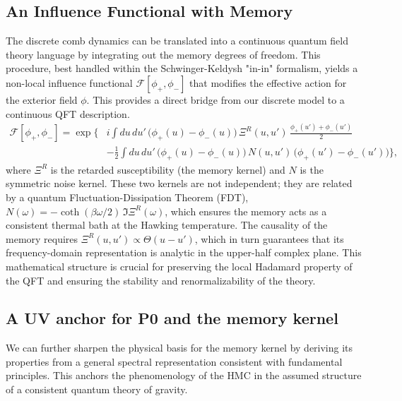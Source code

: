\documentclass[a4paper,11pt]{article}
\newcommand{\HMC}{\textsc{HMC}\xspace}
\theoremstyle{plain}
\theoremstyle{definition}
\theoremstyle{remark}
\begin{document}
\subsection{An Influence Functional with Memory}
\label{sec:influence}
The discrete comb dynamics can be translated into a continuous quantum field theory language by integrating out the memory degrees of freedom. This procedure, best handled within the Schwinger-Keldysh "in-in" formalism, yields a non-local influence functional $\mathcal{F}[\phi_+, \phi_-]$ that modifies the effective action for the exterior field $\phi$. This provides a direct bridge from our discrete model to a continuous QFT description.
\begin{align}
    \mathcal{F}[\phi_+, \phi_-]=\exp\Bigg\{ & i\!\int \!du\,du'\,\big(\phi_+(u)-\phi_-(u)\big)\,\Xi^R(u, u')\,\frac{\phi_+(u')+\phi_-(u')}{2} \nonumber \\
    & - \frac{1}{2}\!\int \!du\,du'\,\big(\phi_+(u)-\phi_-(u)\big)\,N(u,u')\,\big(\phi_+(u')-\phi_-(u')\big) \Bigg\},
    \label{eq:influence_functional}
\end{align}
where $\Xi^R$ is the retarded susceptibility (the memory kernel) and $N$ is the symmetric noise kernel. These two kernels are not independent; they are related by a quantum Fluctuation-Dissipation Theorem (FDT), $N(\omega)= - \coth(\beta \omega/2)\,\Im \Xi^R(\omega)$, which ensures the memory acts as a consistent thermal bath at the Hawking temperature. The causality of the memory requires $\Xi^R(u,u') \propto \Theta(u-u')$, which in turn guarantees that its frequency-domain representation is analytic in the upper-half complex plane. This mathematical structure is crucial for preserving the local Hadamard property of the QFT and ensuring the stability and renormalizability of the theory.

\subsection{A UV anchor for \texorpdfstring{P0}{P0} and the memory kernel}
\label{ssec:uv-anchor}
We can further sharpen the physical basis for the memory kernel by deriving its properties from a general spectral representation consistent with fundamental principles. This anchors the phenomenology of the \HMC{} in the assumed structure of a consistent quantum theory of gravity.
\end{document}
